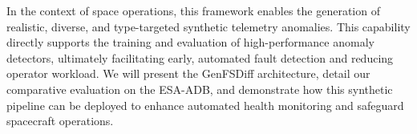 \documentclass[11pt,a4paper]{article}
\begin{document}
In the context of space operations, this framework enables the generation of realistic, diverse, and type-targeted synthetic telemetry anomalies. This capability directly supports the training and evaluation of high-performance anomaly detectors, ultimately facilitating early, automated fault detection and reducing operator workload. We will present the GenFSDiff architecture, detail our comparative evaluation on the ESA-ADB, and demonstrate how this synthetic pipeline can be deployed to enhance automated health monitoring and safeguard spacecraft operations.
\medskip
\end{document}
